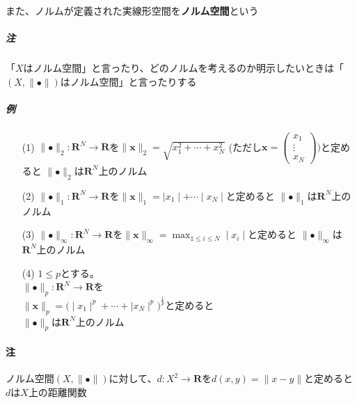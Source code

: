 \documentclass[12pt,a4paper]{article}
\begin{document}
    また、ノルムが定義された実線形空間を{\bf ノルム空間}という
    \subparagraph{注} 
      「$X$はノルム空間」と言ったり、どのノルムを考えるのか明示したいときは「$(X, \parallel \bullet \parallel)$はノルム空間」と言ったりする
      
    \subparagraph{例}
      \begin{itemize}
        \item[(1)] $\parallel \bullet \parallel_2 : \mathbf{R}^N \rightarrow \mathbf{R}$を$\parallel \mathbf{x} \parallel_2 = \sqrt{x_1^2 + \cdots + x_N^2}$
          (ただし$\mathbf{x} = \begin{pmatrix} x_1 \\ \vdots \\ x_N \end{pmatrix})$と定めると
          $\parallel \bullet \parallel_2$は$\mathbf{R}^N$上のノルム
        \item[(2)] $\parallel \bullet \parallel_1 : \mathbf{R}^N \rightarrow \mathbf{R}$を$\parallel \mathbf{x} \parallel_1 = \mid x_1 \mid + \cdots  \mid x_N \mid$と定めると
          $\parallel \bullet \parallel_1$は$\mathbf{R}^N$上のノルム
        \item[(3)] $\parallel \bullet \parallel_\infty : \mathbf{R}^N \rightarrow \mathbf{R}$を$\parallel \mathbf{x} \parallel_\infty = \max_{1 \leq i \leq N} \mid x_i \mid $と定めると
          $\parallel \bullet \parallel_\infty$は$\mathbf{R}^N$上のノルム
        \item[(4)] $1 \leq p$とする。\\ $\parallel\bullet\parallel_p : \mathbf{R}^N \rightarrow \mathbf{R}$を \\
        $\parallel \mathbf{x} \parallel_p = {\big( \mid x_1\mid^p + \cdots + \mid x_N \mid^p \big)}^\frac1p$と定めると \\
          $\parallel\bullet\parallel_p$は$\mathbf{R}^N$上のノルム
      \end{itemize}
    
    \paragraph{注}
      ノルム空間$(X, \parallel\bullet\parallel)$に対して、$d: X^2 \rightarrow \mathbf{R}$を$d(x, y) = \parallel x - y \parallel$と定めると$d$は$X$上の距離関数
    
\end{document}
